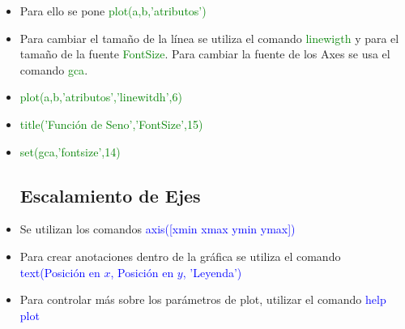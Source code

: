 \documentclass{article}
\begin{document}
\begin{itemize}
	\item Para ello se pone \textcolor{green}{plot(a,b,'atributos')}
	
	\item Para cambiar el tamaño de la línea se utiliza el comando \textcolor{green}{linewigth} y para el tamaño de la fuente \textcolor{green}{FontSize}. Para cambiar la fuente de los Axes se usa el comando \textcolor{green}{gca}.
	
	\item \textcolor{green}{plot(a,b,'atributos','linewitdh',6)}
	
	\item \textcolor{green}{title('Función de Seno','FontSize',15)}
	
	\item \textcolor{green}{set(gca,'fontsize',14)}
	\subsection{Escalamiento de Ejes}
	
	\item Se utilizan los comandos \textcolor{blue}{axis([xmin xmax ymin ymax])}
	
	\item Para crear anotaciones dentro de la gráfica se utiliza el comando \textcolor{blue}{text(Posición en $x$, Posición en $y$, 'Leyenda')}
	
	\item Para controlar más sobre los parámetros de plot, utilizar el comando \textcolor{blue}{help plot}
	
	\end{itemize}
	
\end{document}
